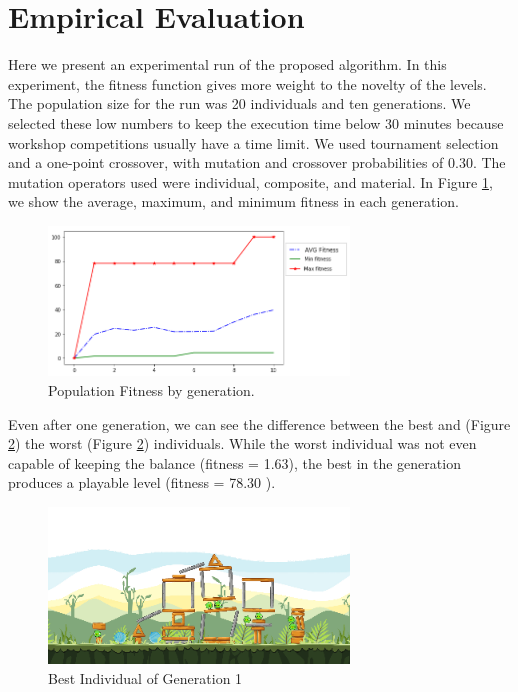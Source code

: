 \documentclass[conference]{IEEEtran}
\begin{document}
\section{Empirical Evaluation }
\label{experiment}

Here we present an experimental run of the proposed algorithm. In this
experiment, the fitness function gives more weight to the novelty of the levels.
The population size for the run was 20 individuals and ten generations. We
selected these low numbers to keep the execution time below 30 minutes because
workshop competitions usually have a time limit. We used tournament selection
and a one-point crossover, with mutation and crossover probabilities of 0.30.
The mutation operators used were individual, composite, and material. In 
Figure \ref{fitness}, we show the average, maximum, and minimum fitness in each generation. 

\begin{figure}[htbp]
   \centerline{\includegraphics[width=80mm]{Images/fitness.png}}
     \caption{Population Fitness by generation.}
         \label{fitness}
\end{figure}

Even after one generation, we can see the difference between the best and
(Figure \ref{gen1best})  the worst (Figure \ref{gen1best}) individuals. While
the worst individual was not even capable of keeping the balance (fitness = 1.63),
the best in the generation produces a playable level (fitness = 78.30 ).

\begin{figure}[htbp]
    \centerline{\includegraphics[width=80mm]{Images/Gen1Ind1_AF.png}}
      \caption{Best Individual of Generation 1}
          \label{gen1best}
\end{figure}
\end{document}
